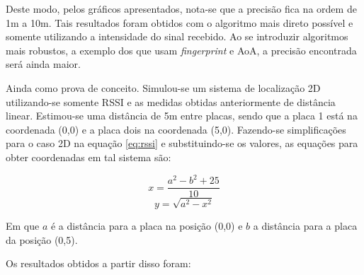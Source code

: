 Deste modo, pelos gráficos apresentados, nota-se que a precisão fica na ordem de 1m a 10m. Tais resultados foram obtidos com o algoritmo mais direto possível e somente utilizando a intensidade do sinal recebido. Ao se introduzir algoritmos mais robustos, a exemplo dos que usam \textit{fingerprint} e AoA, a precisão encontrada será ainda maior.

Ainda como prova de conceito. Simulou-se um sistema de localização 2D utilizando-se somente RSSI e as medidas obtidas anteriormente de distância linear.
Estimou-se uma distância de 5m entre placas, sendo que a placa 1 está na coordenada (0,0) e a placa dois na coordenada (5,0).
Fazendo-se simplificações para o caso 2D na equação \ref{eq:rssi} e substituindo-se os valores, as equações para obter coordenadas em tal sistema são:

\begin{equation}
    x = \frac{a^2 - b^2 + 25}{10} 
\end{equation}
\begin{equation}
    y = \sqrt{a^2 - x^2}
\end{equation}

Em que \(a\) é a distância para a placa na posição (0,0) e \(b\) a distância para a placa da posição (0,5).

Os resultados obtidos a partir disso foram:

